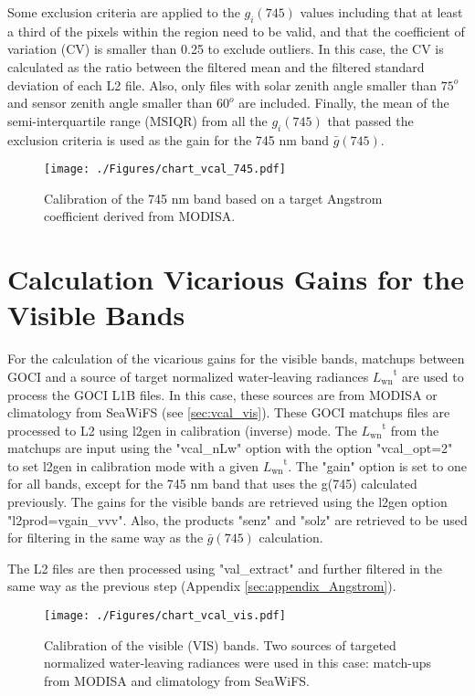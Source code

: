 \documentclass[]{interact}
\theoremstyle{plain}%
\theoremstyle{definition}
\theoremstyle{remark}
\begin{document}
Some exclusion criteria are applied to the $g_i(745)$ values including that at least a third of the pixels within the region need to be valid, and that the coefficient of variation (CV) is smaller than 0.25 to exclude outliers. In this case, the CV is calculated as the ratio between the filtered mean and the filtered standard deviation of each L2 file. Also, only files with solar zenith angle smaller than $75^o$ and sensor zenith angle smaller than $60^o$ are included. Finally, the mean of the semi-interquartile range (MSIQR) from all the $g_i(745)$ that passed the exclusion criteria is used as the gain for the 745 nm band $\bar{g}(745)$.

\begin{figure}[H]
  \centering
  \texttt{[image: ./Figures/chart\_vcal\_745.pdf]}
    \caption{Calibration of the 745 nm band based on a target Angstrom coefficient derived from MODISA.  \label{fig:chart_vcal_745}} 
\end{figure}

\section{Calculation Vicarious Gains for the Visible Bands}\label{sec:appendix_VIS}
For the calculation of the vicarious gains for the visible bands, matchups between GOCI and a source of target normalized water-leaving radiances ${L_\text{wn}}^\text{t}$ are used to process the GOCI L1B files. In this case, these sources are from MODISA or climatology from SeaWiFS (see \autoref{sec:vcal_vis}). These GOCI matchups files are processed to L2 using l2gen in calibration (inverse) mode. The ${L_\text{wn}}^\text{t}$ from the matchups are input using the "vcal\_nLw" option with the option "vcal\_opt=2" to set l2gen in calibration mode with a given ${L_\text{wn}}^\text{t}$. The "gain" option is set to one for all bands, except for the 745 nm band that uses the g(745) calculated previously. The gains for the visible bands are retrieved using the l2gen option "l2prod=vgain\_vvv". Also, the products "senz" and "solz" are retrieved to be used for filtering in the same way as the $\bar{g}(745)$ calculation. 

The L2 files are then processed using "val\_extract" and further filtered in the same way as the previous step (Appendix \ref{sec:appendix_Angstrom}).
\begin{figure}[H]
  \centering
  \texttt{[image: ./Figures/chart\_vcal\_vis.pdf]}
    \caption{Calibration of the visible (VIS) bands. Two sources of targeted normalized water-leaving radiances were used in this case: match-ups from MODISA and climatology from SeaWiFS.  \label{fig:chart_vcal_vis}} 
\end{figure}
\end{document}
